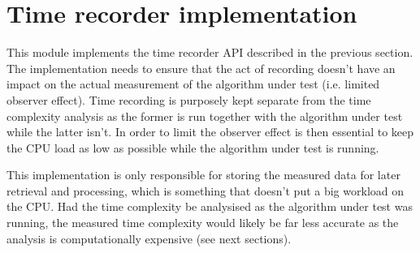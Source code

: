 \section{Time recorder implementation}
This module implements the time recorder API described in the previous section. The implementation needs to ensure that the act of recording doesn't have an impact on the actual measurement of the algorithm under test (i.e. limited observer effect). Time recording is purposely kept separate from the time complexity analysis as the former is run together with the algorithm under test while the latter isn't. In order to limit the observer effect is then essential to keep the CPU load as low as possible while the algorithm under test is running. 

\noindent This implementation is only responsible for storing the measured data for later retrieval and processing, which is something that doesn't put a big workload on the CPU. Had the time complexity be analysised as the algorithm under test was running, the measured time complexity would likely be far less accurate as the analysis is computationally expensive (see next sections).

